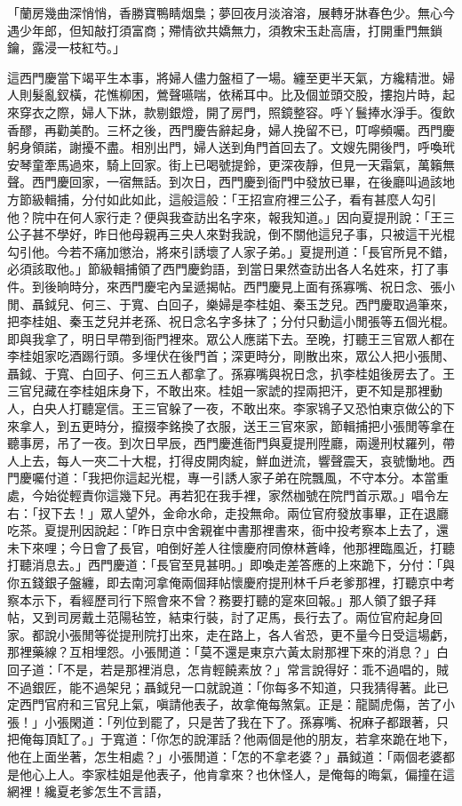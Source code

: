\begin{showcontents}{}
「蘭房幾曲深悄悄，香勝寶鴨睛烟梟；夢回夜月淡溶溶，展轉牙牀春色少。無心今遇少年郎，但知敲打須富商；殢情欲共嬌無力，須教宋玉赴高唐，打開重門無鎖鑰，露浸一枝紅芍。」

這西門慶當下竭平生本事，將婦人儘力盤桓了一場。纏至更半天氣，方纔精泄。婦人則髮亂釵橫，花憔柳困，鶯聲嚥喘，依稀耳中。比及個並頭交股，摟抱片時，起來穿衣之際，婦人下牀，款剔銀燈，開了房門，照鏡整容。呼丫鬟捧水淨手。復飲香醪，再勸美酌。三杯之後，西門慶告辭起身，婦人挽留不已，叮嚀頻囑。西門慶躬身領諾，謝擾不盡。相別出門，婦人送到角門首回去了。文嫂先開後門，呼喚玳安琴童牽馬過來，騎上回家。街上已喝號提鈴，更深夜靜，但見一天霜氣，萬籟無聲。西門慶回家，一宿無話。到次日，西門慶到衙門中發放已畢，在後廳叫過該地方節級輯捕，分付如此如此，這般這般：「王招宣府裡三公子，看有甚麼人勾引他？院中在何人家行走？便與我查訪出名字來，報我知道。」因向夏提刑說：「王三公子甚不學好，昨日他母親再三央人來對我說，倒不關他這兒子事，只被這干光棍勾引他。今若不痛加懲治，將來引誘壞了人家子弟。」夏提刑道：「長官所見不錯，必須該取他。」節級輯捕領了西門慶鈞語，到當日果然查訪出各人名姓來，打了事件。到後晌時分，來西門慶宅內呈遞揭帖。西門慶見上面有孫寡嘴、祝日念、張小閒、聶鉞兒、何三、于寬、白回子，樂婦是李桂姐、秦玉芝兒。西門慶取過筆來，把李桂姐、秦玉芝兒并老孫、祝日念名字多抹了；分付只動這小閒張等五個光棍。即與我拿了，明日早帶到衙門裡來。眾公人應諾下去。至晚，打聽王三官眾人都在李桂姐家吃酒踢行頭。多埋伏在後門首；深更時分，剛散出來，眾公人把小張閒、聶鉞、于寬、白回子、何三五人都拿了。孫寡嘴與祝日念，扒李桂姐後房去了。王三官兒藏在李桂姐床身下，不敢出來。桂姐一家諕的捏兩把汗，更不知是那裡動人，白央人打聽寔信。王三官躲了一夜，不敢出來。李家鴇子又恐怕東京做公的下來拿人，到五更時分，攛掇李銘換了衣服，送王三官來家，節輯捕把小張閒等拿在聽事房，吊了一夜。到次日早辰，西門慶進衙門與夏提刑陞廳，兩邊刑杖羅列，帶人上去，每人一夾二十大棍，打得皮開肉綻，鮮血迸流，響聲震天，哀號慟地。西門慶囑付道：「我把你這起光棍，專一引誘人家子弟在院飄風，不守本分。本當重處，今始從輕責你這幾下兒。再若犯在我手裡，家然枷號在院門首示眾。」唱令左右：「扠下去！」眾人望外，金命水命，走投無命。兩位官府發放事畢，正在退廳吃茶。夏提刑因說起：「昨日京中舍親崔中書那裡書來，衙中投考察本上去了，還未下來哩；今日會了長官，咱倒好差人往懷慶府同僚林蒼峰，他那裡臨風近，打聽打聽消息去。」西門慶道：「長官至見甚明。」即喚走差答應的上來跪下，分付：「與你五錢銀子盤纏，即去南河拿俺兩個拜帖懷慶府提刑林千戶老爹那裡，打聽京中考察本示下，看經歷司行下照會來不曾？務要打聽的寔來回報。」那人領了銀子拜帖，又到司房戴土范陽毡笠，結束行裝，討了疋馬，長行去了。兩位官府起身回家。都說小張閒等從提刑院打出來，走在路上，各人省恐，更不量今日受這場虧，那裡藥線？互相埋怨。小張閒道：「莫不還是東京六黃太尉那裡下來的消息？」白回子道：「不是，若是那裡消息，怎肯輕饒素放？」常言說得好：乖不過唱的，賊不過銀匠，能不過架兒；聶鉞兒一口就說道：「你每多不知道，只我猜得著。此已定西門官府和三官兒上氣，嗔請他表子，故拿俺每煞氣。正是：龍鬬虎傷，苦了小張！」小張閑道：「列位到罷了，只是苦了我在下了。孫寡嘴、祝麻子都跟著，只把俺每頂缸了。」于寬道：「你怎的說渾話？他兩個是他的朋友，若拿來跪在地下，他在上面坐著，怎生相處？」小張閒道：「怎的不拿老婆？」聶鉞道：「兩個老婆都是他心上人。李家桂姐是他表子，他肯拿來？也休怪人，是俺每的晦氣，偏撞在這網裡！纔夏老爹怎生不言語，
\end{showcontents}
